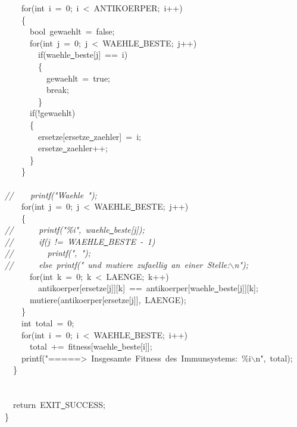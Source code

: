 {\ \ \ \ for(int\ i\ =\ 0;\ i\ <{}\ ANTIKOERPER;\ i++)\\
\ \ \ \ \{\\
\ \ \ \ \ \ bool\ gewaehlt\ =\ false;\\
\ \ \ \ \ \ for(int\ j\ =\ 0;\ j\ <{}\ WAEHLE\underline\ BESTE;\ j++)\\
\ \ \ \ \ \ \ \ if(waehle\underline\ beste[j]\ ==\ i)\\
\ \ \ \ \ \ \ \ \{\\
\ \ \ \ \ \ \ \ \ \ gewaehlt\ =\ true;\\
\ \ \ \ \ \ \ \ \ \ break;\\
\ \ \ \ \ \ \ \ \}\\
\ \ \ \ \ \ if(!gewaehlt)\\
\ \ \ \ \ \ \{\\
\ \ \ \ \ \ \ \ ersetze[ersetze\underline\ zaehler]\ =\ i;\\
\ \ \ \ \ \ \ \ ersetze\underline\ zaehler++;\\
\ \ \ \ \ \ \}\\
\ \ \ \ \}\\
\ \\
\textsl{//\ \ \ \ printf("{}Waehle\ "{});}\\
\ \ \ \ for(int\ j\ =\ 0;\ j\ <{}\ WAEHLE\underline\ BESTE;\ j++)\\
\ \ \ \ \{\\
\textsl{//\ \ \ \ \ \ printf("{}\%i"{},\ waehle\underline\ beste[j]);}\\
\textsl{//\ \ \ \ \ \ if(j\ !=\ WAEHLE\underline\ BESTE\ -{}\ 1)}\\
\textsl{//\ \ \ \ \ \ \ \ printf("{},\ "{});}\\
\textsl{//\ \ \ \ \ \ else\ printf("{}\ und\ mutiere\ zufaellig\ an\ einer\ Stelle:$\backslash$n"{});}\\
\ \ \ \ \ \ for(int\ k\ =\ 0;\ k\ <{}\ LAENGE;\ k++)\\
\ \ \ \ \ \ \ \ antikoerper[ersetze[j]][k]\ ==\ antikoerper[waehle\underline\ beste[j]][k];\\
\ \ \ \ \ \ mutiere(antikoerper[ersetze[j]],\ LAENGE);\\
\ \ \ \ \}\\
\ \ \ \ int\ total\ =\ 0;\\
\ \ \ \ for(int\ i\ =\ 0;\ i\ <{}\ WAEHLE\underline\ BESTE;\ i++)\\
\ \ \ \ \ \ total\ +=\ fitness[waehle\underline\ beste[i]];\\
\ \ \ \ printf("{}=====>{}\ Insgesamte\ Fitness\ des\ Immunsystems:\ \%i$\backslash$n"{},\ total);\\
\ \ \}\\
\ \\
\ \ \\
\ \ return\ EXIT\underline\ SUCCESS;\\
\}\\
\ \\
\ \\
 }
\normalfont\normalsize

